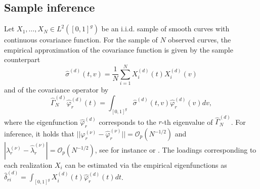 \subsection{Sample inference}
Let $X_1,\dots, X_N \in L^2([0,1]^g)$ be an i.i.d. sample of smooth curves with continuous covariance function. %
For the sample of $N$ observed curves, the empirical approximation of the covariance function is given by the sample counterpart 
\begin{equation} \label{sigma}
\hat{\sigma}^{(d)}(t,v) = \frac{1}{N} \sum_{i=1}^N X^{(d)}_i(t) X^{(d)}_i(v)
\end{equation}
and of the covariance operator by
 \begin{equation}\label{opemp}
 \hat{\Gamma}^{(d)}_N \hat{\varphi}^{(d)}_r (t)=\int_{[0,1]^g}\hat{\sigma}^{(d)}(t,v)\hat{\varphi}_r^{(d)}(v)dv,
\end{equation}
where the eigenfunction $\hat{\varphi}_r^{(d)}$ corresponds to the $r$-th eigenvalue of $\hat{\Gamma}^{(d)}_N $. For inference, it holds that $||\varphi^{(\nu)}_r-\hat{\varphi}^{(\nu)}_r||=\mathcal{O}_p(N^{-1/2})$ and $|\lambda^{(\nu)}_r-\hat{\lambda}^{(\nu)}_r|=\mathcal{O}_p(N^{-1/2})$, see for instance \cite{Pousse:82} or \cite{Hall:2006}. %
The loadings corresponding to each realization $X_i$ can be estimated via the empirical eigenfunctions as $\hat{\delta}^{(d)}_{ri}= \int_{[0,1]^g} X^{(d)}_i(t) \hat{\varphi}^{(d)}_r(t) dt$. 

